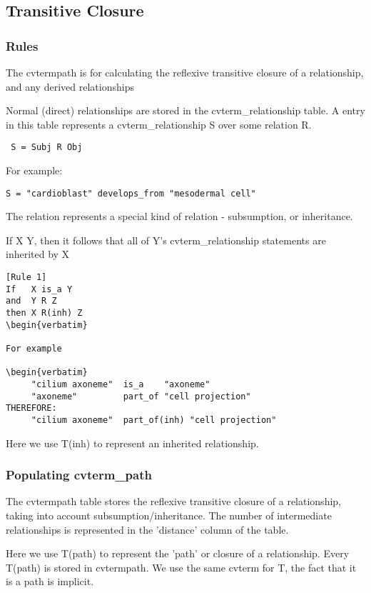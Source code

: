 \subsection{Transitive Closure}

\subsubsection{Rules}

The cvtermpath is for calculating the reflexive transitive closure of
a relationship, and any derived relationships

Normal (direct) relationships are stored in the cvterm\_relationship
table. A entry in this table represents a cvterm\_relationship S over
some relation R.

\begin{verbatim}
 S = Subj R Obj
\end{verbatim}

For example:

 {\tt S = "cardioblast" develops\_from "mesodermal cell"}

The relation \isa represents a special kind of relation -
subsumption, or inheritance.

If X \isa Y, then it follows that all of Y's cvterm\_relationship
statements are inherited by X

\begin{verbatim}
[Rule 1]
If   X is_a Y
and  Y R Z
then X R(inh) Z
\begin{verbatim}

For example

\begin{verbatim}
     "cilium axoneme"  is_a    "axoneme"
     "axoneme"         part_of "cell projection"
THEREFORE:
     "cilium axoneme"  part_of(inh) "cell projection"
\end{verbatim}

Here we use T(inh) to represent an inherited relationship.

\subsubsection{Populating cvterm\_path}

The cvtermpath table stores the reflexive transitive closure of a
relationship, taking into account subsumption/inheritance. The number
of intermediate relationships is represented in the 'distance' column
of the table.

Here we use T(path) to represent the 'path' or closure of a
relationship. Every T(path) is stored in cvtermpath. We use the same
cvterm for T, the fact that it is a path is implicit.

